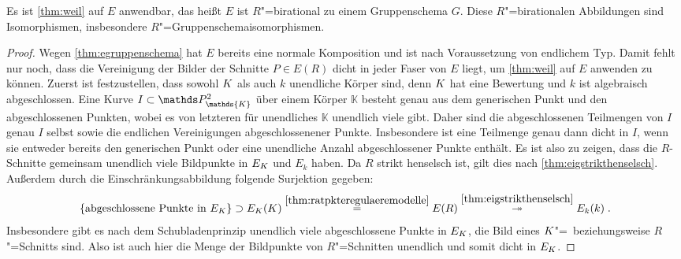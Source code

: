 \begin{Lemma}\label{thm:äqgruppenschema}
  Es ist \ref{thm:weil} auf $E$ anwendbar, das heißt $E$ ist
  $R$"=birational zu einem Gruppenschema $G$. Diese $R$"=birationalen
  Abbildungen sind Isomorphismen, insbesondere
  $R$"=Gruppenschemaisomorphismen.
  \begin{proof}
    Wegen \ref{thm:egruppenschema} hat $E$ bereits eine normale
    Komposition und ist nach Voraussetzung von endlichem Typ. Damit
    fehlt nur noch, dass die Vereinigung der Bilder der Schnitte
    ${P\in E(R)}$ dicht in jeder Faser von $E$ liegt, um
    \ref{thm:weil} auf $E$ anwenden zu können.
    Zuerst ist festzustellen, dass sowohl $K$ als auch $k$ unendliche
    Körper sind, denn $K$ hat eine Bewertung und $k$ ist algebraisch
    abgeschlossen.
    Eine Kurve $I\subset\P_\mathds{K}^2$ über einem Körper
    $\mathds{K}$ besteht genau aus dem generischen Punkt und den
    abgeschlossenen Punkten, wobei es von letzteren für unendliches
    $\mathds{K}$ unendlich viele gibt. Daher sind die abgeschlossenen
    Teilmengen von $I$ genau $I$ selbst sowie die endlichen
    Vereinigungen abgeschlossenener Punkte. Insbesondere ist eine
    Teilmenge genau dann dicht in $I$, wenn sie entweder bereits den
    generischen Punkt oder eine unendliche Anzahl abgeschlossener
    Punkte enthält.
    Es ist also zu zeigen, dass die $R$-Schnitte gemeinsam unendlich
    viele Bildpunkte in $E_{K}$ und $E_k$ haben.
    Da $R$ strikt henselsch ist, gilt dies nach
    \ref{thm:eigstrikthenselsch}. Außerdem durch die
    Einschränkungsabbildung folgende Surjektion gegeben:
    \begin{gather*}
      \{\text{abgeschlossene Punkte in $E_{K}$}\}\supset
      E_{K}(K)\overset{\ref{thm:ratpkteregulaeremodelle}}{=}
      E(R)\overset{\ref{thm:eigstrikthenselsch}}\twoheadrightarrow
      E_k(k)\;.
    \end{gather*}
    Insbesondere gibt es nach dem Schubladenprinzip unendlich viele
    abgeschlossene Punkte in $E_{K}$, die Bild eines
    $K$"=~beziehungsweise $R$"=Schnitts sind. Also ist auch hier die
    Menge der Bildpunkte von $R$"=Schnitten unendlich und somit dicht
    in $E_{K}$.
    

\end{proof}
\end{Lemma}
